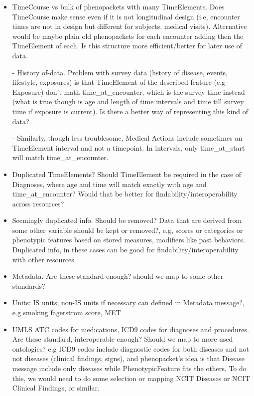 \documentclass[a4paper, 10pt]{article}
\begin{document}
\begin{itemize}

\item TimeCourse vs bulk of phenopackets with many TimeElements. Does TimeCourse make sense even if it is not longitudinal design (i.e, encounter times are not in design but different for subjects, medical visits). Alternative would be maybe plain old phenopackets for each encounter adding then the TimeElement of each. Is this structure more efficient/better for later use of data.

\item[-] History of-data. Problem with survey data (hstory of disease, events, lifestyle, exposures) is that TimeElement of the described feature (e.g Exposure) don't math time\_at\_encounter, which is the survey time instead (what is true though is age and length of time intervals and time till survey time if exposure is current). Is there a better way of representing this kind of data?

\item[-] Similarly, though less troublesome, Medical Actions include sometimes an TimeElement interval and not a timepoint. In intervals, only time\_at\_start will match time\_at\_encounter. 

\item Duplicated TimeElements? Should TimeElement be required in the case of Diagnoses, where age and time will match exactly with age and time\_at\_encounter? Would that be better for findability/interoperability across resources?


\item Seemingly duplicated info. Should be removed? Data that are derived from some other variable should be kept or removed?, e.g, scores or categories or phenotypic features based on stored measures, modifiers like past behaviors. Duplicated info, in these cases can be good for findability/interoperability with other resources.

\item Metadata. Are these standard enough? should we map to some other standards?


\item Units: IS units, non-IS units if necessary can defined in Metadata message?, e.g smoking fagerstrom score, MET


\item UMLS ATC codes for medications, ICD9 codes for diagnoses and procedures. Are these standard, interoperable enough? Should we map to more used ontologies? e.g ICD9 codes include diagnostic codes for both diseases and not not diseases (clinical findings, signs), and phenopacket's idea is that Disease message include only diseases while PhenotypicFeature fits the others. To do this, we would need to do some selection or mapping NCIT Diseases or NCIT Clinical Findings, or similar.


\end{itemize}
\end{document}
